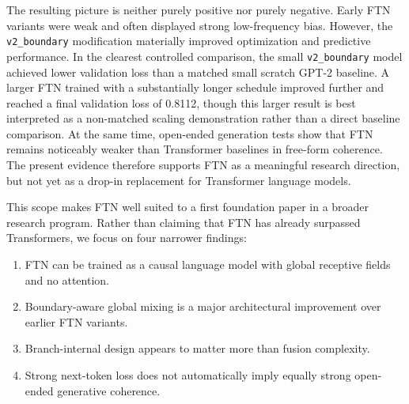 \documentclass[11pt]{article}
\begin{document}
The resulting picture is neither purely positive nor purely negative. Early FTN variants were weak and often displayed strong low-frequency bias. However, the \texttt{v2\_boundary} modification materially improved optimization and predictive performance. In the clearest controlled comparison, the small \texttt{v2\_boundary} model achieved lower validation loss than a matched small scratch GPT-2 baseline. A larger FTN trained with a substantially longer schedule improved further and reached a final validation loss of 0.8112, though this larger result is best interpreted as a non-matched scaling demonstration rather than a direct baseline comparison. At the same time, open-ended generation tests show that FTN remains noticeably weaker than Transformer baselines in free-form coherence. The present evidence therefore supports FTN as a meaningful research direction, but not yet as a drop-in replacement for Transformer language models.

This scope makes FTN well suited to a first foundation paper in a broader research program. Rather than claiming that FTN has already surpassed Transformers, we focus on four narrower findings:
\begin{enumerate}[leftmargin=1.5em]
    \item FTN can be trained as a causal language model with global receptive fields and no attention.
    \item Boundary-aware global mixing is a major architectural improvement over earlier FTN variants.
    \item Branch-internal design appears to matter more than fusion complexity.
    \item Strong next-token loss does not automatically imply equally strong open-ended generative coherence.
\end{enumerate}
\end{document}
